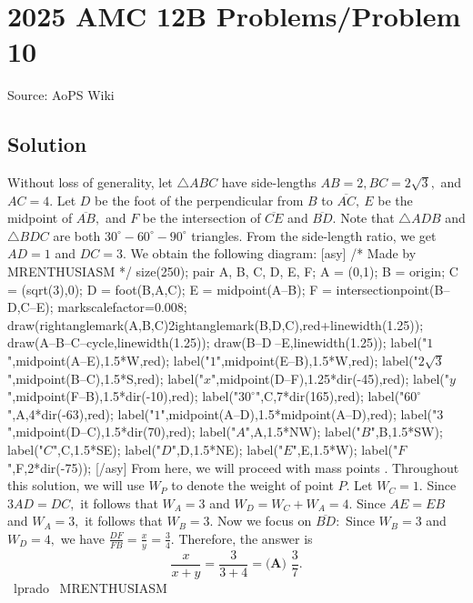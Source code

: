 \documentclass[12pt]{article}
\begin{document}
\section*{{2025 AMC 12B Problems/Problem 10}}
Source: AoPS Wiki

\subsection*{Solution}
Without loss of generality, let $\triangle ABC$ have side-lengths $AB=2, BC=2\sqrt{3},$ and $AC=4.$ Let $D$ be the foot of the perpendicular from $B$ to $\overline{AC}, \ E$ be the midpoint of $\overline{AB},$ and $F$ be the intersection of $\overline{CE}$ and $\overline{BD}.$ Note that $\triangle ADB$ and $\triangle BDC$ are both $30^\circ{-}60^\circ{-}90^\circ$ triangles. From the side-length ratio, we get $AD=1$ and $DC=3.$ We obtain the following diagram: [asy] /* Made by MRENTHUSIASM */ size(250); pair A, B, C, D, E, F; A = (0,1); B = origin; C = (sqrt(3),0); D = foot(B,A,C); E = midpoint(A--B); F = intersectionpoint(B--D,C--E); markscalefactor=0.008; draw(rightanglemark(A,B,C)^^rightanglemark(B,D,C),red+linewidth(1.25)); draw(A--B--C--cycle,linewidth(1.25)); draw(B--D^^C--E,linewidth(1.25)); label("$1$",midpoint(A--E),1.5*W,red); label("$1$",midpoint(E--B),1.5*W,red); label("$2\sqrt{3}$",midpoint(B--C),1.5*S,red); label("$x$",midpoint(D--F),1.25*dir(-45),red); label("$y$",midpoint(F--B),1.5*dir(-10),red); label("$30^{\circ}$",C,7*dir(165),red); label("$60^{\circ}$",A,4*dir(-63),red); label("$1$",midpoint(A--D),1.5*midpoint(A--D),red); label("$3$",midpoint(D--C),1.5*dir(70),red); label("$A$",A,1.5*NW); label("$B$",B,1.5*SW); label("$C$",C,1.5*SE); label("$D$",D,1.5*NE); label("$E$",E,1.5*W); label("$F$",F,2*dir(-75)); [/asy] From here, we will proceed with mass points . Throughout this solution, we will use $W_P$ to denote the weight of point $P.$ Let $W_C=1.$ Since $3AD=DC,$ it follows that $W_A=3$ and $W_D=W_C+W_A=4.$ Since $AE=EB$ and $W_A=3,$ it follows that $W_B=3.$ Now we focus on $\overline{BD}:$ Since $W_B=3$ and $W_D=4,$ we have $\frac{DF}{FB}=\frac xy=\frac34.$ Therefore, the answer is \[\frac{x}{x+y}=\frac{3}{3+4}=\boxed{\textbf{(A) } \dfrac{3}{7}}.\] ~lprado ~MRENTHUSIASM
\end{document}
